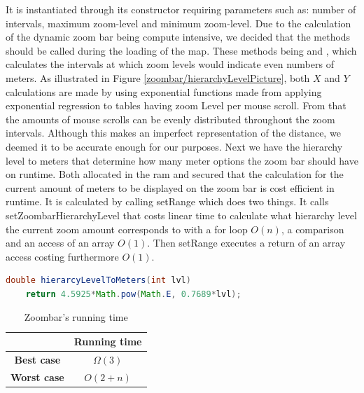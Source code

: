 It is instantiated through its constructor requiring parameters such as: number of intervals, maximum zoom-level and minimum zoom-level. Due to the calculation of the dynamic zoom bar being compute intensive, we decided that the methods should be called during the loading of the map. These methods being  and , which calculates the intervals at which zoom levels would indicate even numbers of meters. As illustrated in Figure \ref{zoombar/hierarchyLevelPicture}, both $X$ and $Y$ calculations are made by using exponential functions made from applying exponential regression to tables having zoom Level per mouse scroll. From that the amounts of mouse scrolls can be evenly distributed throughout the zoom intervals. Although this makes an imperfect representation of the distance, we deemed it to be accurate enough for our purposes. Next we have the hierarchy level to meters that determine how many meter options the zoom bar should have on runtime. Both allocated in the ram and secured that the calculation for the current amount of meters to be displayed on the zoom bar is cost efficient in runtime. It is calculated by calling setRange which does two things. It calls setZoombarHierarchyLevel that costs linear time to calculate what hierarchy level the current zoom amount corresponds to with a for loop $O(n)$, a comparison and an access of an array $O(1)$. Then setRange executes a return of an array access costing furthermore $O(1)$.
\begin{lstlisting}[language=Java, caption=Code of setZoombarHierarchyLevel()]
double hierarcyLevelToMeters(int lvl) 
    return 4.5925*Math.pow(Math.E, 0.7689*lvl);
\end{lstlisting}
\begin{table}[ht]
  \centering
  \begin{tabular}{ c|c }
& \textbf{Running time} \\ 
   \hline
   \textbf{Best case} & $\Omega (3)$ \\
   \textbf{Worst case} & $O(2+n)$ \\
  \end{tabular}\\
  \caption{\centering Zoombar's running time }\label{zoomBar/runnintime}
\end{table}